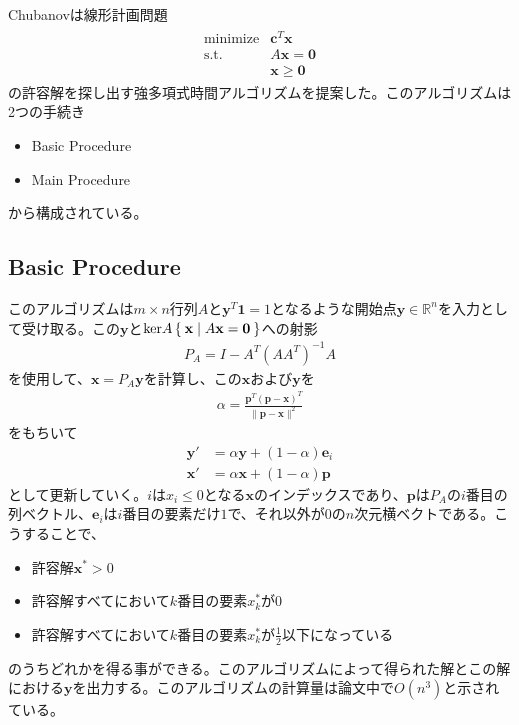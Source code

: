 Chubanovは線形計画問題
\begin{align*}
  \begin{array}{ll}
    \text{minimize} & \mathbf{c}^T \mathbf{x} \\
    \text{s.t.}     & A \mathbf{x} = \mathbf{0} \\
                    & \mathbf{x} \geq \mathbf{0}
  \end{array}
\end{align*}
の許容解を探し出す強多項式時間アルゴリズムを提案した。このアルゴリズムは2つの手続き
\begin{itemize}
  \item Basic Procedure
  \item Main Procedure
\end{itemize}
から構成されている。

\subsection{Basic Procedure}
このアルゴリズムは$m \times n$行列$A$と$\mathbf{y}^T \mathbf{1} = 1$となるような開始点$\mathbf{y} \in \mathbb{R}^n$を入力として受け取る。この$\mathbf{y}$と$\mathrm{ker}A \Set{\mathbf{x} | A \mathbf{x} = \mathbf{0}}$への射影
\begin{align*}
  P_A = I - A^T \left(A A^T\right)^{-1} A
\end{align*}
を使用して、$\mathbf{x} = P_A \mathbf{y}$を計算し、この$\mathbf{x}$および$\mathbf{y}$を
\begin{align*}
  \alpha = \frac{\mathbf{p}^T \left(\mathbf{p} - \mathbf{x}\right)^T}{\|\mathbf{p} - \mathbf{x}\|^2}
\end{align*}
をもちいて
\begin{align*}
  \mathbf{y}' & = \alpha \mathbf{y} + \left(1 - \alpha\right) \mathbf{e}_i \\
  \mathbf{x}' & = \alpha \mathbf{x} + \left(1 - \alpha\right) \mathbf{p}
\end{align*}
として更新していく。$i$は$x_i \leq 0$となる$\mathbf{x}$のインデックスであり、$\mathbf{p}$は$P_A$の$i$番目の列ベクトル、$\mathbf{e}_i$は$i$番目の要素だけ$1$で、それ以外が$0$の$n$次元横ベクトである。こうすることで、
\begin{itemize}
  \item 許容解$\mathbf{x}^* > 0$
  \item 許容解すべてにおいて$k$番目の要素$x_k^*$が$0$
  \item 許容解すべてにおいて$k$番目の要素$x_k^*$が$\frac{1}{2}$以下になっている
\end{itemize}
のうちどれかを得る事ができる。このアルゴリズムによって得られた解とこの解における$\mathbf{y}$を出力する。このアルゴリズムの計算量は論文中で$O(n^3)$と示されている。

